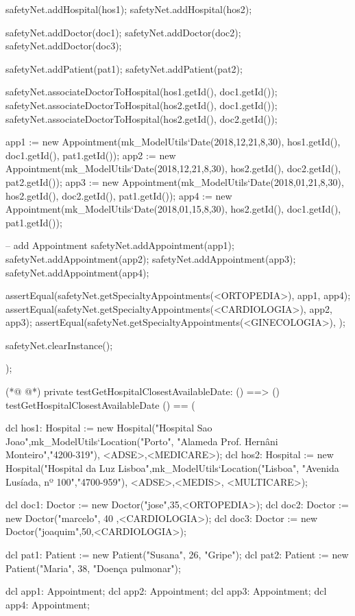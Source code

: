 \begin{vdmpp}[breaklines=true]
  safetyNet.addHospital(hos1);
  safetyNet.addHospital(hos2);
  
  safetyNet.addDoctor(doc1);
  safetyNet.addDoctor(doc2);
  safetyNet.addDoctor(doc3);
  
  safetyNet.addPatient(pat1);
  safetyNet.addPatient(pat2);

  safetyNet.associateDoctorToHospital(hos1.getId(), doc1.getId());
  safetyNet.associateDoctorToHospital(hos2.getId(), doc1.getId());
  safetyNet.associateDoctorToHospital(hos2.getId(), doc2.getId());

  app1 := new Appointment(mk_ModelUtils`Date(2018,12,21,8,30), hos1.getId(), doc1.getId(), pat1.getId());
  app2 := new Appointment(mk_ModelUtils`Date(2018,12,21,8,30), hos2.getId(), doc2.getId(), pat2.getId());
  app3 := new Appointment(mk_ModelUtils`Date(2018,01,21,8,30), hos2.getId(), doc2.getId(), pat1.getId());
  app4 := new Appointment(mk_ModelUtils`Date(2018,01,15,8,30), hos2.getId(), doc1.getId(), pat1.getId());
    
  -- add Appointment
  safetyNet.addAppointment(app1);
  safetyNet.addAppointment(app2);
  safetyNet.addAppointment(app3);
  safetyNet.addAppointment(app4);
  
  assertEqual(safetyNet.getSpecialtyAppointments(<ORTOPEDIA>), {app1, app4});
  assertEqual(safetyNet.getSpecialtyAppointments(<CARDIOLOGIA>), {app2, app3});
  assertEqual(safetyNet.getSpecialtyAppointments(<GINECOLOGIA>), {});
  
  
  safetyNet.clearInstance();
    
);

(*@
\label{testGetHospitalClosestAvailableDate:904}
@*)
private testGetHospitalClosestAvailableDate: () ==> ()
 testGetHospitalClosestAvailableDate () == (
 
  dcl hos1: Hospital := new Hospital("Hospital Sao Joao",mk_ModelUtils`Location("Porto", "Alameda Prof. Hernâni Monteiro","4200-319"), {<ADSE>,<MEDICARE>});
  dcl hos2: Hospital := new Hospital("Hospital da Luz Lisboa",mk_ModelUtils`Location("Lisboa", "Avenida Lusíada, nº 100","4700-959"), {<ADSE>,<MEDIS>, <MULTICARE>});
  
  dcl doc1: Doctor := new Doctor("jose",35,<ORTOPEDIA>);
  dcl doc2: Doctor := new Doctor("marcelo", 40 ,<CARDIOLOGIA>);
  dcl doc3: Doctor := new Doctor("joaquim",50,<CARDIOLOGIA>);
  
  dcl pat1: Patient := new Patient("Susana", 26, "Gripe");
  dcl pat2: Patient := new Patient("Maria", 38, "Doença pulmonar");
  
  dcl app1: Appointment;
  dcl app2: Appointment;
  dcl app3: Appointment;
  dcl app4: Appointment;
  

\end{vdmpp}

